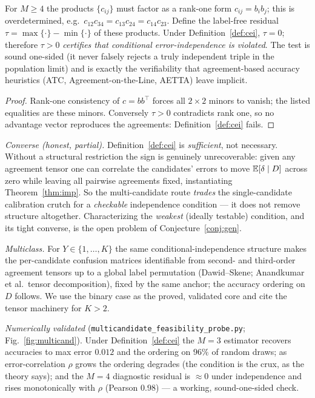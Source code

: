 \begin{proposition}\label{prop:cei-test}
For $M\ge4$ the products $\{c_{ij}\}$ must factor as a rank-one form $c_{ij}=b_ib_j$;
this is overdetermined, e.g.\ $c_{12}c_{34}=c_{13}c_{24}=c_{14}c_{23}$. Define the
label-free residual $\tau=\max\{\cdot\}-\min\{\cdot\}$ of these products. Under
Definition~\ref{def:cei}, $\tau=0$; therefore $\tau>0$ \emph{certifies that conditional
error-independence is violated}. The test is sound one-sided (it never falsely rejects a
truly independent triple in the population limit) and is exactly the verifiability that
agreement-based accuracy heuristics (ATC, Agreement-on-the-Line, AETTA) leave implicit.
\end{proposition}
\begin{proof}
Rank-one consistency of $c=bb^\top$ forces all $2\times2$ minors to vanish; the listed
equalities are these minors. Conversely $\tau>0$ contradicts rank one, so no advantage
vector reproduces the agreements: Definition~\ref{def:cei} fails.
\end{proof}

\noindent\emph{Converse (honest, partial).} Definition~\ref{def:cei} is \emph{sufficient},
not necessary. Without a structural restriction the sign is genuinely unrecoverable:
given any agreement tensor one can correlate the candidates' errors to move
$\mathbb{E}[\delta\mid D]$ across zero while leaving all pairwise agreements fixed, instantiating
Theorem~\ref{thm:imp}. So the multi-candidate route \emph{trades} the single-candidate
calibration crutch for a \emph{checkable} independence condition --- it does not remove
structure altogether. Characterizing the \emph{weakest} (ideally testable) condition, and
its tight converse, is the open problem of Conjecture~\ref{conj:gen}.

\noindent\emph{Multiclass.} For $Y\in\{1,\dots,K\}$ the same conditional-independence
structure makes the per-candidate confusion matrices identifiable from second- and
third-order agreement tensors up to a global label permutation (Dawid--Skene; Anandkumar
et al.\ tensor decomposition), fixed by the same anchor; the accuracy ordering on $D$
follows. We use the binary case as the proved, validated core and cite the tensor
machinery for $K>2$.

\noindent\emph{Numerically validated}
(\texttt{multicandidate\_feasibility\_probe.py}; Fig.~\ref{fig:multicand}). Under
Definition~\ref{def:cei} the $M{=}3$ estimator recovers accuracies to max error $0.012$
and the ordering on $96\%$ of random draws; as error-correlation $\rho$ grows the
ordering degrades (the condition is the crux, as the theory says); and the $M{=}4$
diagnostic residual is $\approx\!0$ under independence and rises monotonically with
$\rho$ (Pearson $0.98$) --- a working, sound-one-sided check.

